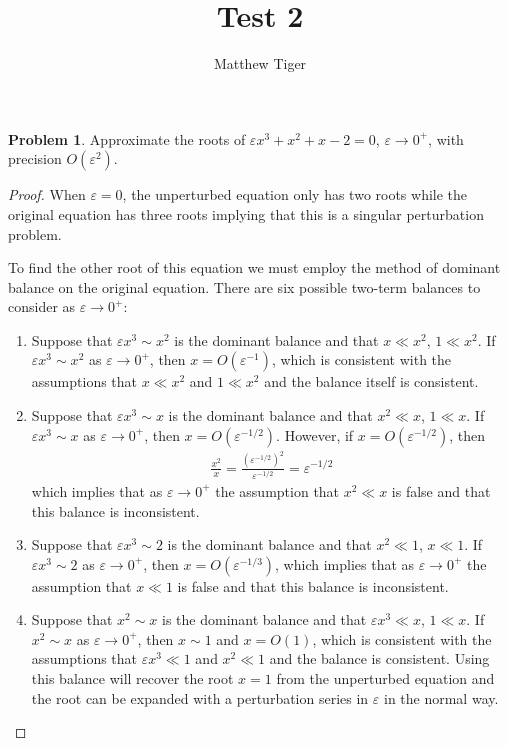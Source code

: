 \documentclass[12pt]{article}
\title{Test 2}
\author{Matthew Tiger}
\theoremstyle{definition}
\newtheorem{problem}{Problem}
\begin{document}
\maketitle


\begin{problem}
  Approximate the roots of $\varepsilon x^3 + x^2 +x - 2 = 0$, $\varepsilon \to 0^+$, with
  precision $O(\varepsilon^2)$.
\end{problem}

\begin{proof}
  When $\varepsilon = 0$, the unperturbed equation only has two roots while the original equation
  has three roots implying that this is a singular perturbation problem.

  To find the other root of this equation we must employ the method of dominant balance on the
  original equation. There are six possible two-term balances to consider as $\varepsilon \to 0^+$:
  \begin{enumerate}
    \item Suppose that $\varepsilon x^3 \sim x^2$ is the dominant balance and that $x \ll x^2$, $1 \ll x^2$.
      If $\varepsilon x^3 \sim x^2$ as $\varepsilon \to 0^+$, then $x = O(\varepsilon^{-1})$, which is consistent
      with the assumptions that $x \ll x^2$ and $1 \ll x^2$ and the balance itself is consistent.

    \item Suppose that $\varepsilon x^3 \sim x$ is the dominant balance and that $x^2 \ll x$, $1 \ll x$.
      If $\varepsilon x^3 \sim x$ as $\varepsilon \to 0^+$, then $x = O(\varepsilon^{-1/2})$.
      However, if $x = O(\varepsilon^{-1/2})$, then
      \begin{align*}
        \frac{x^2}{x} = \frac{\left(\varepsilon^{-1/2}\right)^2}{\varepsilon^{-1/2}} = \varepsilon^{-1/2}
      \end{align*}
      which implies that as $\varepsilon \to 0^+$ the assumption that $x^2 \ll x$ is false and that this balance is inconsistent.

    \item Suppose that $\varepsilon x^3 \sim 2$ is the dominant balance and that $x^2 \ll 1$, $x \ll 1$.
      If $\varepsilon x^3 \sim 2$ as $\varepsilon \to 0^+$, then $x = O(\varepsilon^{-1/3})$, which
      implies that as $\varepsilon \to 0^+$ the assumption that $x \ll 1$ is false and that this balance is inconsistent.

    \item Suppose that $x^2 \sim x$ is the dominant balance and that $\varepsilon x^3 \ll x$, $1 \ll x$.
      If $x^2 \sim x$ as $\varepsilon \to 0^+$, then $x \sim 1$ and $x = O(1)$, which is consistent with the assumptions
      that $\varepsilon x^3 \ll 1$ and $x^2 \ll 1$ and the balance is consistent. Using this balance
      will recover the root $x=1$ from the unperturbed equation and the root can be expanded with a perturbation series in $\varepsilon$ in the normal way.


\end{enumerate}
\end{proof}
\end{document}
